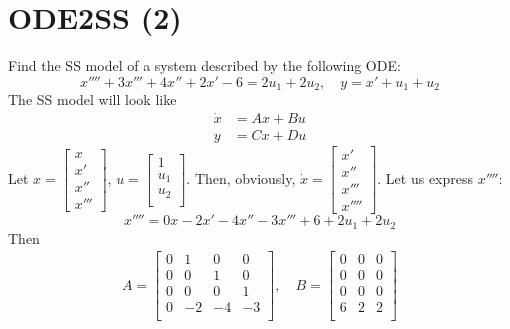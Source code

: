 \documentclass{article}
\begin{document}
\section{ODE2SS (2)}
    Find the SS model of a system described by the following ODE:
    \begin{equation}
        x'''' + 3x''' + 4x'' + 2x' - 6 = 2u_1 + 2u_2, \quad y = x' + u_1 + u_2
    \end{equation}
    The SS model will look like
    \begin{align}
        \dot{x} &= Ax + Bu\\
        y &= Cx + Du
    \end{align}
    Let
    $x = \begin{bmatrix}
        x\\ 
        x'\\
        x''\\
        x'''
    \end{bmatrix}$, 
    $u = \begin{bmatrix}
        1\\
        u_1\\
        u_2\\
    \end{bmatrix}
    $. Then, obviously, 
    $\dot{x} = 
    \begin{bmatrix}
        x'\\ 
        x''\\
        x'''\\
        x''''
    \end{bmatrix}$. Let us express $x''''$:
    \begin{equation}
        x'''' = 0x - 2x' - 4x'' - 3x''' + 6 + 2u_1 + 2u_2
    \end{equation}
    Then
    \begin{align}
        A = 
        \begin{bmatrix}
            0 & 1 & 0 & 0\\
            0 & 0 & 1 & 0\\
            0 & 0 & 0 & 1\\
            0 & -2 & -4 & -3\\
        \end{bmatrix}, \quad 
        B = 
        \begin{bmatrix}
            0 & 0 & 0\\
            0 & 0 & 0\\
            0 & 0 & 0\\
            6 & 2 & 2\\
        \end{bmatrix}
    \end{align}
\end{document}
